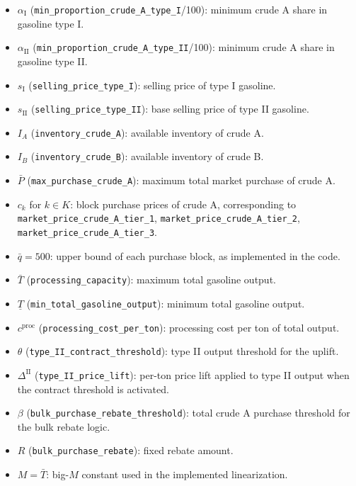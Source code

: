 \begin{itemize}
    \item $\alpha_{\mathrm{I}}$ (\texttt{min\_proportion\_crude\_A\_type\_I}/100): minimum crude A share in gasoline type I.
    \item $\alpha_{\mathrm{II}}$ (\texttt{min\_proportion\_crude\_A\_type\_II}/100): minimum crude A share in gasoline type II.
    \item $s_{\mathrm{I}}$ (\texttt{selling\_price\_type\_I}): selling price of type I gasoline.
    \item $s_{\mathrm{II}}$ (\texttt{selling\_price\_type\_II}): base selling price of type II gasoline.
    \item $I_A$ (\texttt{inventory\_crude\_A}): available inventory of crude A.
    \item $I_B$ (\texttt{inventory\_crude\_B}): available inventory of crude B.
    \item $\bar P$ (\texttt{max\_purchase\_crude\_A}): maximum total market purchase of crude A.
    \item $c_k$ for $k\in K$: block purchase prices of crude A, corresponding to
    \texttt{market\_price\_crude\_A\_tier\_1},
    \texttt{market\_price\_crude\_A\_tier\_2},
    \texttt{market\_price\_crude\_A\_tier\_3}.
    \item $\bar q = 500$: upper bound of each purchase block, as implemented in the code.
    \item $\bar T$ (\texttt{processing\_capacity}): maximum total gasoline output.
    \item $\underline T$ (\texttt{min\_total\_gasoline\_output}): minimum total gasoline output.
    \item $c^{\mathrm{proc}}$ (\texttt{processing\_cost\_per\_ton}): processing cost per ton of total output.
    \item $\theta$ (\texttt{type\_II\_contract\_threshold}): type II output threshold for the uplift.
    \item $\Delta^{\mathrm{II}}$ (\texttt{type\_II\_price\_lift}): per-ton price lift applied to type II output when the contract threshold is activated.
    \item $\beta$ (\texttt{bulk\_purchase\_rebate\_threshold}): total crude A purchase threshold for the bulk rebate logic.
    \item $R$ (\texttt{bulk\_purchase\_rebate}): fixed rebate amount.
    \item $M=\bar T$: big-$M$ constant used in the implemented linearization.
\end{itemize}

